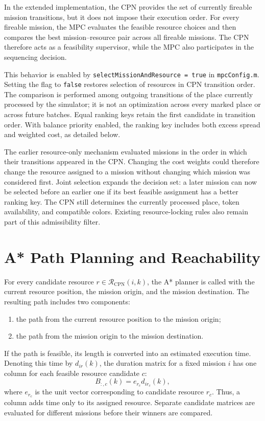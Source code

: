 In the extended implementation, the CPN provides the set of currently
fireable mission transitions, but it does not impose their execution order.
For every fireable mission, the MPC evaluates the feasible resource choices
and then compares the best mission--resource pair across all fireable
missions. The CPN therefore acts as a feasibility supervisor, while the MPC
also participates in the sequencing decision.

This behavior is enabled by \texttt{selectMissionAndResource = true} in
\texttt{mpcConfig.m}. Setting the flag to \texttt{false} restores selection
of resources in CPN transition order. The comparison is performed among
outgoing transitions of the place currently processed by the simulator;
it is not an optimization across every marked place or across future batches.
Equal ranking keys retain the first candidate in transition order. With
balance priority enabled, the ranking key includes both excess spread and
weighted cost, as detailed below.

The earlier resource-only mechanism evaluated missions in the order in which
their transitions appeared in the CPN. Changing the cost weights could
therefore change the resource assigned to a mission without changing which
mission was considered first. Joint selection expands the decision set: a
later mission can now be selected before an earlier one if its best feasible
assignment has a better ranking key. The CPN still determines the currently
processed place, token availability, and compatible colors. Existing
resource-locking rules also remain part of this admissibility filter.

\section{A* Path Planning and Reachability}

For every candidate resource $r \in \mathcal{R}_{\mathrm{CPN}}(i,k)$, the A*
planner is called with the current resource position, the mission origin,
and the mission destination. The resulting path includes two components:
\begin{enumerate}
	\item the path from the current resource position to the mission origin;
	\item the path from the mission origin to the mission destination.
\end{enumerate}

If the path is feasible, its length is converted into an estimated execution
time. Denoting this time by $d_{ir}(k)$, the duration matrix for a fixed
mission $i$ has one column for each feasible resource candidate $c$:
\begin{equation}
	B_{:,c}(k) = e_{r_c}d_{i r_c}(k),
\end{equation}
where $e_{r_c}$ is the unit vector corresponding to candidate resource $r_c$.
Thus, a column adds time only to its assigned resource. Separate candidate
matrices are evaluated for different missions before their winners are
compared.

